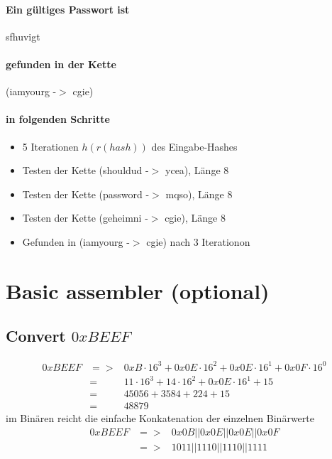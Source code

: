 \paragraph{Ein gültiges Passwort ist}
sfhuvigt

\paragraph{gefunden in der Kette}
(iamyourg -$>$ cgie)

\paragraph{in folgenden Schritte}
\begin{itemize}
\item 5 Iterationen $h(r(hash))$ des Eingabe-Hashes
\item Testen der Kette (shouldud -$>$ ycea), Länge 8
\item Testen der Kette (password -$>$ mqso), Länge 8
\item Testen der Kette (geheimni -$>$ cgie), Länge 8
\item Gefunden in (iamyourg -$>$ cgie) nach 3 Iterationon
\end{itemize}



\section{Basic assembler (optional)}

\subsection*{Convert $0xBEEF$}
\begin{eqnarray}
    0xBEEF &=>& 0xB\cdot16^3 + 0x0E\cdot16^2 + 0x0E\cdot16^1 + 0x0F\cdot16^0 \\
           &=& 11\cdot16^3 + 14\cdot16^2 + 0x0E\cdot16^1 + 15 \\
           &=& 45056 + 3584 + 224 + 15 \\
           &=& 48879
\end{eqnarray}
im Binären reicht die einfache Konkatenation der einzelnen Binärwerte
\begin{eqnarray}
    0xBEEF &=>& 0x0B || 0x0E || 0x0E || 0x0F \\
           &=>& 1011 || 1110 || 1110 || 1111 \\
\end{eqnarray}

